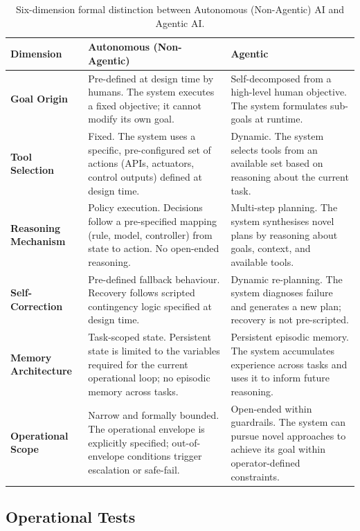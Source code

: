 \documentclass[12pt, a4paper]{article}
\begin{document}
\begin{table}[ht]
\centering
\caption{Six-dimension formal distinction between Autonomous (Non-Agentic) AI and Agentic AI.}
\label{tab:distinction}
\begin{tabular}{p{3cm}p{5cm}p{5cm}}
\toprule
\textbf{Dimension} & \textbf{Autonomous (Non-Agentic)} & \textbf{Agentic} \\
\midrule
\textbf{Goal Origin}
  & Pre-defined at design time by humans. The system executes a fixed objective; it cannot modify its own goal.
  & Self-decomposed from a high-level human objective. The system formulates sub-goals at runtime. \\
\addlinespace
\textbf{Tool Selection}
  & Fixed. The system uses a specific, pre-configured set of actions (APIs, actuators, control outputs) defined at design time.
  & Dynamic. The system selects tools from an available set based on reasoning about the current task. \\
\addlinespace
\textbf{Reasoning Mechanism}
  & Policy execution. Decisions follow a pre-specified mapping (rule, model, controller) from state to action. No open-ended reasoning.
  & Multi-step planning. The system synthesises novel plans by reasoning about goals, context, and available tools. \\
\addlinespace
\textbf{Self-Correction}
  & Pre-defined fallback behaviour. Recovery follows scripted contingency logic specified at design time.
  & Dynamic re-planning. The system diagnoses failure and generates a new plan; recovery is not pre-scripted. \\
\addlinespace
\textbf{Memory Architecture}
  & Task-scoped state. Persistent state is limited to the variables required for the current operational loop; no episodic memory across tasks.
  & Persistent episodic memory. The system accumulates experience across tasks and uses it to inform future reasoning. \\
\addlinespace
\textbf{Operational Scope}
  & Narrow and formally bounded. The operational envelope is explicitly specified; out-of-envelope conditions trigger escalation or safe-fail.
  & Open-ended within guardrails. The system can pursue novel approaches to achieve its goal within operator-defined constraints. \\
\bottomrule
\end{tabular}
\end{table}

\subsection{Operational Tests}
\end{document}
